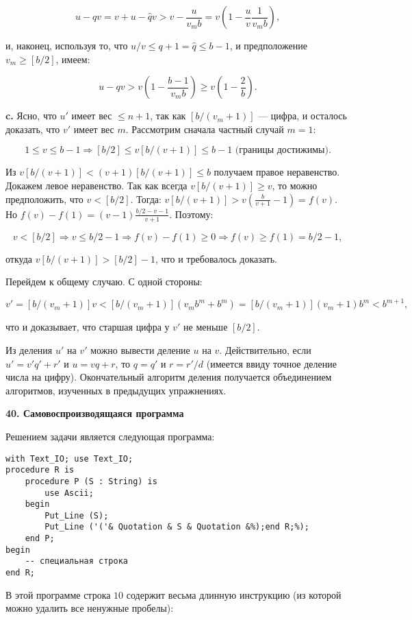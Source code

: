 \[
u-qv = v+u-\hat{q}v > v-\dfrac{u}{v_mb} = v(1-\dfrac{u}{v}\dfrac{1}{v_mb}),
\]

\noindent и, наконец, используя то, что $u/v \le q+1 = \hat{q} \le b-1$, и предположение $v_m \ge [b/2]$, имеем:

\[
u-qv > v(1-\dfrac{b-1}{v_mb}) \ge v(1-\dfrac{2}{b}).
\]

\textbf{c.} Ясно, что $u'$ имеет вес $\le n+1$, так как $[b/(v_m + 1)]$ — цифра, и осталось доказать, что $v'$ имеет вес $m$. Рассмотрим сначала частный случай $m = 1$:

\[
1 \le v \le b-1 \Longrightarrow [b/2] \le v[b/(v+1)] \le b-1 \text{ (границы достижимы)}.
\]

\noindent Из $v[b/(v+1)] < (v+1)[b/(v+1)] \le b$ получаем правое неравенство. Докажем левое неравенство. Так как всегда $v[b/(v+1)] \ge v$, то можно предположить, что $v<[b/2]$. Тогда: $v[b/(v+1)] > v(\frac{b}{v+1} - 1) = f(v)$. Но $f(v)-f(1) = (v-1)\frac{b/2-v-1}{v+1}$. Поэтому:

\[
v < [b/2] \Longrightarrow v \le b/2-1 \Longrightarrow f(v)-f(1) \ge 0 \Longrightarrow f(v) \ge f(1) = b/2-1,
\]

откуда $v[b/(v+1)] > [b/2]-1$, что и требовалось доказать.

Перейдем к общему случаю. С одной стороны:

\[
v' = [b/(v_m+1)]v < [b/(v_m+1)](v_mb^m+b^m) = [b/(v_m+1)](v_m+1)b^m<b^{m+1},
\]

\noindent что и доказывает, что старшая цифра у $v'$ не меньше $[b/2]$.

Из деления $u'$ на $v'$ можно вывести деление $u$ на $v$. Действительно, если $u'=v'q'+r'$ и $u=vq+r$, то $q=q'$ и $r=r'/d$ (имеется ввиду точное деление числа на цифру). Окончательный алгоритм деления получается объединением алгоритмов, изученных в предыдущих упражнениях.

\pagebreak

\noindent \textbf{40. Самовоспроизводящаяся программа}

Решением задачи является следующая программа:

\begin{lstlisting}[frame=none]
with Text_IO; use Text_IO;
procedure R is
	procedure P (S : String) is
		use Ascii;
	begin
		Put_Line (S);
		Put_Line ('('& Quotation & S & Quotation &%);end R;%);
	end P;
begin
	-- специальная строка
end R;
\end{lstlisting}

В этой программе строка $10$ содержит весьма длинную инструкцию (из которой можно удалить все ненужные пробелы):

